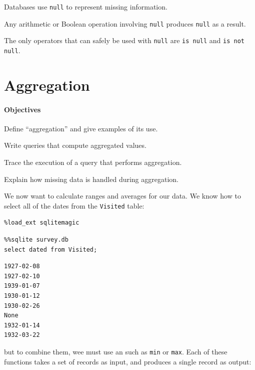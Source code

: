 \documentclass{book}
\begin{document}
\begin{swcitemize}
\item
  Databases use \texttt{null} to represent missing information.
\item
  Any arithmetic or Boolean operation involving \texttt{null} produces
  \texttt{null} as a result.
\item
  The only operators that can safely be used with \texttt{null} are
  \texttt{is null} and \texttt{is not null}.
\end{swcitemize}

\section{Aggregation}

\mbox{}\paragraph{Objectives}

\begin{swcitemize}
\item
  Define ``aggregation'' and give examples of its use.
\item
  Write queries that compute aggregated values.
\item
  Trace the execution of a query that performs aggregation.
\item
  Explain how missing data is handled during aggregation.
\end{swcitemize}

We now want to calculate ranges and averages for our data. We know how
to select all of the dates from the \texttt{Visited} table:

\begin{verbatim}
%load_ext sqlitemagic
\end{verbatim}

\begin{verbatim}
%%sqlite survey.db
select dated from Visited;
\end{verbatim}

\begin{verbatim}
1927-02-08
1927-02-10
1939-01-07
1930-01-12
1930-02-26
None
1932-01-14
1932-03-22
\end{verbatim}

but to combine them, wee must use an
 such as
\texttt{min} or \texttt{max}. Each of these functions takes a set of
records as input, and produces a single record as output:
\end{document}
